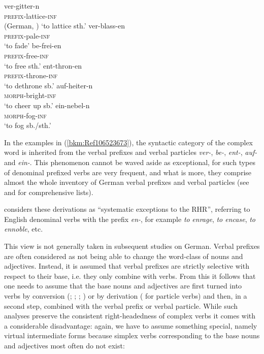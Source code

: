 \documentclass[output=paper
  ,nobabel
  ,draftmode
  ,colorlinks, citecolor=brown
]{langscibook}
\begin{document}
\eal
\label{bkm:Ref106523673}
\ex
\gll ver-gitter-n\\
       \textsc{prefix}{}-lattice-\textsc{inf} \\\hfill(German, \citealt[215, 216]{Elsen2014})
\glt   `to lattice sth.'
\ex
\gll ver-blass-en\\
       \textsc{prefix}{}-pale-\textsc{inf} \\
\glt   `to fade'
\ex
\gll be-frei-en\\
     \textsc{prefix}{}-free-\textsc{inf} \\
\glt   `to free sth.'
\ex
\gll ent-thron-en\\
       \textsc{prefix}{}-throne-\textsc{inf} \\
\glt   `to dethrone sb.'
\ex
\gll auf-heiter-n\\
       \textsc{morph}{}-bright-\textsc{inf} \\
\glt   `to cheer up sb.'
\ex
\gll ein-nebel-n\\
       \textsc{morph}{}-fog-\textsc{inf} \\
\glt   `to fog sb./sth.'
\zl

\noindent
In the examples in (\ref{bkm:Ref106523673}), the syntactic category of the complex word is inherited
from the verbal prefixes and verbal particles \emph{ver-}, \emph{be-}, \emph{ent-}, \emph{auf-} and
\emph{ein-}. This phenomenon cannot be waved aside as exceptional, for such types of denominal
prefixed verbs are very frequent, and what is more, they comprise almost the whole inventory of
German verbal prefixes and verbal particles (see \citealt[Sections~5.2--5.3]{FleischerBarz2012} and
\citealt[215--222]{Elsen2014} for comprehensive lists).

\citet[250]{Williams1981} considers these derivations as ``systematic exceptions to the RHR'',
referring to English denominal verbs with the prefix \emph{en-}, for example \emph{to}
\emph{enrage}, \emph{to encase}, \emph{to ennoble}, etc.

This view is not generally taken in subsequent studies on German. Verbal prefixes are often
considered as not being able to change the word-class of nouns and adjectives. Instead, it is
assumed that verbal prefixes are strictly selective with respect to their base, i.e. they only
combine with verbs. From this it follows that one needs to assume that the base nouns and adjectives
are first turned into verbs by conversion (\citealt{Olsen1990a}; \citealt[49--50,
275--277]{Lohde2006}; \citealt[27--28]{Fortmann2007a}; \citealt[145--149]{Michel2014}) or by
derivation (\citealt[284]{Mueller2003a} for particle verbs) and then, in a second step, combined with
the verbal prefix or verbal particle. While such analyses preserve the consistent right-headedness
of complex verbs it comes with a considerable disadvantage: again, we have to assume something
special, namely virtual intermediate forms because simplex verbs corresponding to the base nouns and
adjectives most often do not exist:
\end{document}
